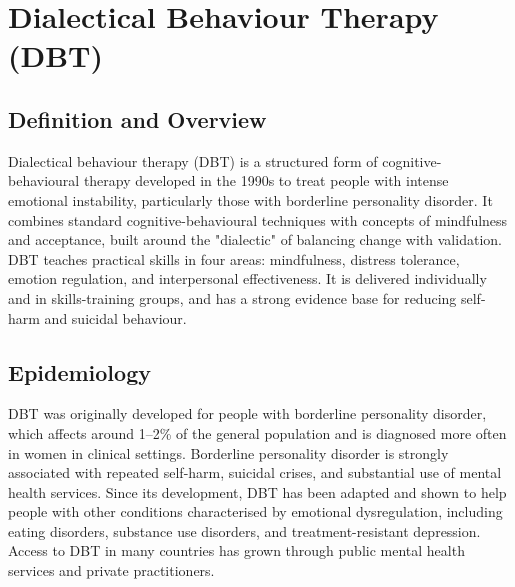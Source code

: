 \chapter{Dialectical Behaviour Therapy (DBT)}

\section*{Definition and Overview}
Dialectical behaviour therapy (DBT) is a structured form of cognitive-behavioural therapy developed in the 1990s to treat people with intense emotional instability, particularly those with borderline personality disorder. It combines standard cognitive-behavioural techniques with concepts of mindfulness and acceptance, built around the "dialectic" of balancing change with validation. DBT teaches practical skills in four areas: mindfulness, distress tolerance, emotion regulation, and interpersonal effectiveness. It is delivered individually and in skills-training groups, and has a strong evidence base for reducing self-harm and suicidal behaviour.

\section*{Epidemiology}
DBT was originally developed for people with borderline personality disorder, which affects around 1--2\% of the general population and is diagnosed more often in women in clinical settings. Borderline personality disorder is strongly associated with repeated self-harm, suicidal crises, and substantial use of mental health services. Since its development, DBT has been adapted and shown to help people with other conditions characterised by emotional dysregulation, including eating disorders, substance use disorders, and treatment-resistant depression. Access to DBT in many countries has grown through public mental health services and private practitioners.

